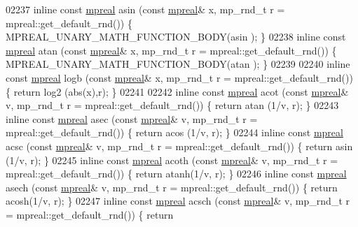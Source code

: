 \begin{DoxyCode}
{{02237 \textcolor{keyword}{inline} \textcolor{keyword}{const} \hyperlink{classmpfr_1_1mpreal}{mpreal} asin  (\textcolor{keyword}{const} \hyperlink{classmpfr_1_1mpreal}{mpreal}& x, mp\_rnd\_t r = mpreal::get\_default\_rnd()) \{   
      MPREAL\_UNARY\_MATH\_FUNCTION\_BODY(asin );    \}
02238 \textcolor{keyword}{inline} \textcolor{keyword}{const} \hyperlink{classmpfr_1_1mpreal}{mpreal} atan  (\textcolor{keyword}{const} \hyperlink{classmpfr_1_1mpreal}{mpreal}& x, mp\_rnd\_t r = mpreal::get\_default\_rnd()) \{   
      MPREAL\_UNARY\_MATH\_FUNCTION\_BODY(atan );    \}
02239 
02240 \textcolor{keyword}{inline} \textcolor{keyword}{const} \hyperlink{classmpfr_1_1mpreal}{mpreal} logb  (\textcolor{keyword}{const} \hyperlink{classmpfr_1_1mpreal}{mpreal}& x, mp\_rnd\_t r = mpreal::get\_default\_rnd()) \{   \textcolor{keywordflow}{return} 
      log2 (abs(x),r);                    \}
02241 
02242 \textcolor{keyword}{inline} \textcolor{keyword}{const} \hyperlink{classmpfr_1_1mpreal}{mpreal} acot  (\textcolor{keyword}{const} \hyperlink{classmpfr_1_1mpreal}{mpreal}& v, mp\_rnd\_t r = mpreal::get\_default\_rnd()) \{   \textcolor{keywordflow}{return} 
      atan (1/v, r);                      \}
02243 \textcolor{keyword}{inline} \textcolor{keyword}{const} \hyperlink{classmpfr_1_1mpreal}{mpreal} asec  (\textcolor{keyword}{const} \hyperlink{classmpfr_1_1mpreal}{mpreal}& v, mp\_rnd\_t r = mpreal::get\_default\_rnd()) \{   \textcolor{keywordflow}{return} 
      acos (1/v, r);                      \}
02244 \textcolor{keyword}{inline} \textcolor{keyword}{const} \hyperlink{classmpfr_1_1mpreal}{mpreal} acsc  (\textcolor{keyword}{const} \hyperlink{classmpfr_1_1mpreal}{mpreal}& v, mp\_rnd\_t r = mpreal::get\_default\_rnd()) \{   \textcolor{keywordflow}{return} 
      asin (1/v, r);                      \}
02245 \textcolor{keyword}{inline} \textcolor{keyword}{const} \hyperlink{classmpfr_1_1mpreal}{mpreal} acoth (\textcolor{keyword}{const} \hyperlink{classmpfr_1_1mpreal}{mpreal}& v, mp\_rnd\_t r = mpreal::get\_default\_rnd()) \{   \textcolor{keywordflow}{return} 
      atanh(1/v, r);                      \}
02246 \textcolor{keyword}{inline} \textcolor{keyword}{const} \hyperlink{classmpfr_1_1mpreal}{mpreal} asech (\textcolor{keyword}{const} \hyperlink{classmpfr_1_1mpreal}{mpreal}& v, mp\_rnd\_t r = mpreal::get\_default\_rnd()) \{   \textcolor{keywordflow}{return} 
      acosh(1/v, r);                      \}
02247 \textcolor{keyword}{inline} \textcolor{keyword}{const} \hyperlink{classmpfr_1_1mpreal}{mpreal} acsch (\textcolor{keyword}{const} \hyperlink{classmpfr_1_1mpreal}{mpreal}& v, mp\_rnd\_t r = mpreal::get\_default\_rnd()) \{   \textcolor{keywordflow}{return} 
}}
\end{DoxyCode}

